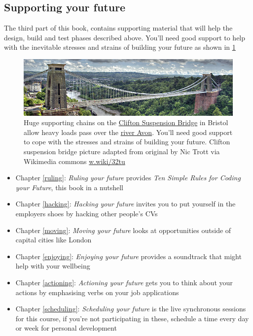 \documentclass[
]{book}
\providecommand{\tightlist}{%
  \setlength{\itemsep}{0pt}\setlength{\parskip}{0pt}}
\begin{document}
\hypertarget{partiii}{%
\subsection{Supporting your future}\label{partiii}}

The third part of this book, contains supporting material that will help the design, build and test phases described above. You'll need good support to help with the inevitable stresses and strains of building your future as shown in \ref{fig:clifton-fig}

\begin{figure}

{\centering \includegraphics[width=1\linewidth]{images/clifton} 

}

\caption{Huge supporting chains on the \href{https://en.wikipedia.org/wiki/Clifton_Suspension_Bridge}{Clifton Suspension Bridge} in Bristol allow heavy loads pass over the \href{https://en.wikipedia.org/wiki/River_Avon,_Bristol}{river Avon}. You'll need good support to cope with the stresses and strains of building your future. Clifton suspension bridge picture adapted from original by Nic Trott via Wikimedia commons \href{https://w.wiki/32tu}{w.wiki/32tu}}\label{fig:clifton-fig}
\end{figure}



\begin{itemize}
\tightlist
\item
  Chapter \ref{ruling}: \emph{Ruling your future} provides \emph{Ten Simple Rules for Coding your Future}, this book in a nutshell
\item
  Chapter \ref{hacking}: \emph{Hacking your future} invites you to put yourself in the employers shoes by hacking other people's CVs
\item
  Chapter \ref{moving}: \emph{Moving your future} looks at opportunities outside of capital cities like London
\item
  Chapter \ref{enjoying}: \emph{Enjoying your future} provides a soundtrack that might help with your wellbeing
\item
  Chapter \ref{actioning}: \emph{Actioning your future} gets you to think about your actions by emphasising verbs on your job applications
\item
  Chapter \ref{scheduling}: \emph{Scheduling your future} is the live synchronous sessions for this course, if you're not participating in these, schedule a time every day or week for personal development
\end{itemize}
\end{document}

